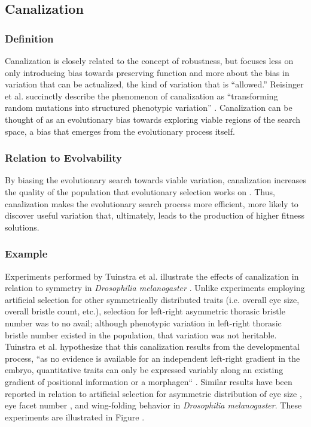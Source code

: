 \subsection{Canalization} \label{sec:canalization}
\subsubsection{Definition}
Canalization is closely related to the concept of robustness, but focuses less on only introducing bias towards preserving function and more about the bias in variation that can be actualized, the kind of variation that is ``allowed.'' Reisinger et al. succinctly describe the phenomenon of canalization as ``transforming random mutations into structured phenotypic variation'' \cite{Reisinger2007AcquiringRepresentations}. Canalization can be thought of as an evolutionary bias towards exploring viable regions of the search space, a bias that emerges from the evolutionary process itself.

\subsubsection{Relation to Evolvability}
By biasing the evolutionary search towards viable variation, canalization increases the quality of the population that evolutionary selection works on \cite[p 40]{Downing2015IntelligenceSystems}.\mindmapmark{\usefulvariationcanalization} Thus, canalization makes the evolutionary search process more efficient, more likely to discover useful variation that, ultimately, leads to the production of higher fitness solutions.

\subsubsection{Example} \label{sec:fly_symmetry}
Experiments performed by Tuinstra et al. illustrate the effects of canalization in relation to symmetry in \textit{Drosophilia melanogaster} \cite{Tuinstra1990LackDevelopment}. Unlike experiments employing artificial selection for other symmetrically distributed traits (i.e. overall eye size, overall bristle count, etc.), selection for left-right asymmetric thorasic bristle number was to no avail; although phenotypic variation in left-right thorasic bristle number existed in the population, that variation was not heritable. Tuinstra et al. hypothesize that this canalization results from the developmental process, ``as no evidence is available for an independent left-right gradient in the embryo, quantitative traits can only be expressed variably along an existing gradient of positional information or a morphagen`` \cite{Tuinstra1990LackDevelopment}. Similar results have been reported in relation to artificial selection for asymmetric distribution of eye size \cite{Coyne1987LackMelanogaster}, eye facet number \cite{ManyardSmith1960ThePattern}, and wing-folding behavior \cite{Purnell1973SelectionMelanogaster} in \textit{Drosophilia melanogaster}. These experiments are illustrated in Figure .


